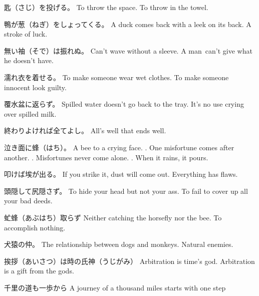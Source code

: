 \par{匙（さじ）を投げる。 \hfill\break
To throw the space. \hfill\break
To throw in the towel. }

\par{鴨が葱（ねぎ）をしょってくる。 \hfill\break
A duck comes back with a leek on its back. \hfill\break
A stroke of luck. }

\par{無い袖（そで）は振れぬ。 \hfill\break
Can't wave without a sleeve. \hfill\break
A man can't give what he doesn't have. }

\par{濡れ衣を着せる。 \hfill\break
To make someone wear wet clothes. \hfill\break
To make someone innocent look guilty. }

\par{覆水盆に返らず。 \hfill\break
Spilled water doesn't go back to the tray. \hfill\break
It's no use crying over spilled milk. }

\par{終わりよければ全てよし。 \hfill\break
All's well that ends well. }

\par{泣き面に蜂（はち）。 \hfill\break
A bee to a crying face. \hfill{}. One misfortune comes after another. \hfill{}. Misfortunes never come alone. \hfill{}. When it rains, it pours. }

\par{叩けば埃が出る。 \hfill\break
If you strike it, dust will come out. \hfill\break
Everything has flaws. }

\par{頭隠して尻隠さず。 \hfill\break
To hide your head but not your ass. \hfill\break
To fail to cover up all your bad deeds. }

\par{虻蜂（あぶはち）取らず \hfill\break
Neither catching the horsefly nor the bee. \hfill\break
To accomplish nothing. }

\par{犬猿の仲。 \hfill\break
The relationship between dogs and monkeys. \hfill\break
Natural enemies. }

\par{挨拶（あいさつ）は時の氏神（うじがみ） \hfill\break
Arbitration is time's god. \hfill\break
Arbitration is a gift from the gods. }

\par{千里の道も一歩から \hfill\break
A journey of a thousand miles starts with one step }

